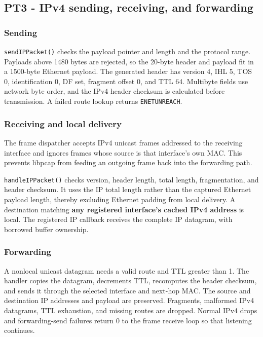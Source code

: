 \documentclass[
  a4paper,
  10pt]{article}
\begin{document}
\subsection{PT3 - IPv4 sending, receiving, and
forwarding}\label{pt3---ipv4-sending-receiving-and-forwarding}

\subsubsection{Sending}\label{sending}

\texttt{sendIPPacket()} checks the payload pointer and length and the
protocol range. Payloads above 1480 bytes are rejected, so the 20-byte
header and payload fit in a 1500-byte Ethernet payload. The generated
header has version 4, IHL 5, TOS 0, identification 0, DF set, fragment
offset 0, and TTL 64. Multibyte fields use network byte order, and the
IPv4 header checksum is calculated before transmission. A failed route
lookup returns \texttt{ENETUNREACH}.

\subsubsection{Receiving and local
delivery}\label{receiving-and-local-delivery}

The frame dispatcher accepts IPv4 unicast frames addressed to the
receiving interface and ignores frames whose source is that interface's
own MAC. This prevents libpcap from feeding an outgoing frame back into
the forwarding path.

\texttt{handleIPPacket()} checks version, header length, total length,
fragmentation, and header checksum. It uses the IP total length rather
than the captured Ethernet payload length, thereby excluding Ethernet
padding from local delivery. A destination matching \textbf{any
registered interface's cached IPv4 address} is local. The registered IP
callback receives the complete IP datagram, with borrowed buffer
ownership.

\subsubsection{Forwarding}\label{forwarding}

A nonlocal unicast datagram needs a valid route and TTL greater than 1.
The handler copies the datagram, decrements TTL, recomputes the header
checksum, and sends it through the selected interface and next-hop MAC.
The source and destination IP addresses and payload are preserved.
Fragments, malformed IPv4 datagrams, TTL exhaustion, and missing routes
are dropped. Normal IPv4 drops and forwarding-send failures return 0 to
the frame receive loop so that listening continues.
\end{document}

